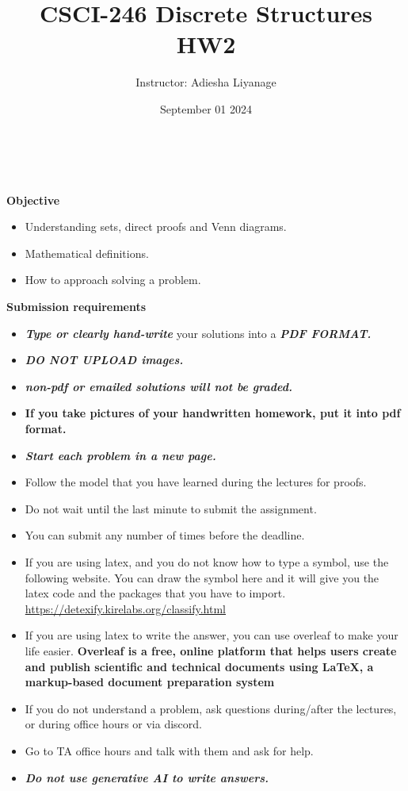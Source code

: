 \documentclass[12pt]{exam}
\title{CSCI-246 Discrete Structures HW2}
\author{Instructor: Adiesha Liyanage}
\date{September 01 2024}
\begin{document}
\maketitle

\hrulefill
\\
\\
\textbf{Objective}
\begin{itemize}
    \item Understanding sets, direct proofs and Venn diagrams.
    \item Mathematical definitions.
    \item How to approach solving a problem.
\end{itemize}

\textbf{Submission requirements}
\begin{itemize}
    \item \textbf{\textit{Type or clearly hand-write}} your solutions into a \textbf{\textit{PDF FORMAT.}} 
    \item \textbf{\textit{DO NOT UPLOAD images.}}
    \item \textbf{\textit{non-pdf or emailed solutions will not be graded.}}
    \item \textbf{If you take pictures of your handwritten homework, put it into pdf format.}
    \item \textbf{\textit{Start each problem in a new page.}}
    \item Follow the model that you have learned during the lectures for proofs.
    \item Do not wait until the last minute to submit the assignment.
    \item You can submit any number of times before the deadline. 
    \item If you are using latex, and you do not know how to type a symbol, use the following website. You can draw the symbol here and it will give you the latex code and the packages that you have to import. \url{https://detexify.kirelabs.org/classify.html}
    \item If you are using latex to write the answer, you can use overleaf to make your life easier. \textbf{Overleaf is a free, online platform that helps users create and publish scientific and technical documents using LaTeX, a markup-based document preparation system}
    \item If you do not understand a problem, ask questions during/after the lectures, or during office hours or via discord.
    \item Go to TA office hours and talk with them and ask for help.
    \item \textbf{\textit{Do not use generative AI to write answers.}} 
\end{itemize}
\end{document}
